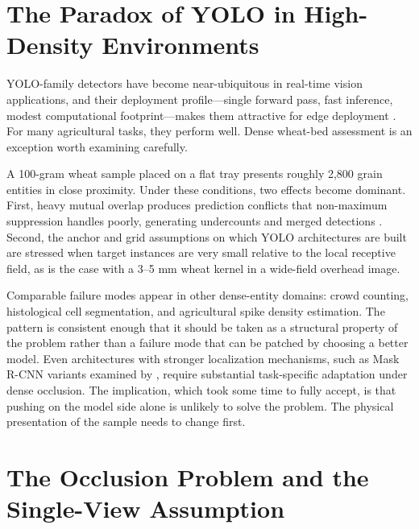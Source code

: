 \section{The Paradox of YOLO in High-Density Environments}

YOLO-family detectors have become near-ubiquitous in real-time vision applications, and their deployment profile---single forward pass, fast inference, modest computational footprint---makes them attractive for edge deployment \cite{YOLOReview2024}. For many agricultural tasks, they perform well. Dense wheat-bed assessment is an exception worth examining carefully.

A 100-gram wheat sample placed on a flat tray presents roughly 2,800 grain entities in close proximity. Under these conditions, two effects become dominant. First, heavy mutual overlap produces prediction conflicts that non-maximum suppression handles poorly, generating undercounts and merged detections \cite{YOLODense2025}. Second, the anchor and grid assumptions on which YOLO architectures are built are stressed when target instances are very small relative to the local receptive field, as is the case with a 3--5 mm wheat kernel in a wide-field overhead image.

Comparable failure modes appear in other dense-entity domains: crowd counting, histological cell segmentation, and agricultural spike density estimation. The pattern is consistent enough that it should be taken as a structural property of the problem rather than a failure mode that can be patched by choosing a better model. Even architectures with stronger localization mechanisms, such as Mask R-CNN variants examined by \cite{Xu2023}, require substantial task-specific adaptation under dense occlusion. The implication, which took some time to fully accept, is that pushing on the model side alone is unlikely to solve the problem. The physical presentation of the sample needs to change first.

\section{The Occlusion Problem and the Single-View Assumption}

